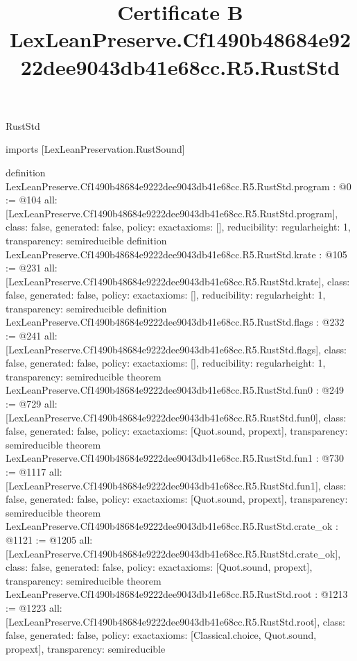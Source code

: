 \begin{lexlean}{RustStd}
\title{Certificate B LexLeanPreserve.Cf1490b48684e9222dee9043db41e68cc.R5.RustStd}
\begin{coremodule}
imports [LexLeanPreservation.RustSound]

definition LexLeanPreserve.Cf1490b48684e9222dee9043db41e68cc.R5.RustStd.program : @0 := @104 {
  all: [LexLeanPreserve.Cf1490b48684e9222dee9043db41e68cc.R5.RustStd.program],
  class: false,
  generated: false,
  policy: exact{axioms: []},
  reducibility: regular{height: 1},
  transparency: semireducible
}
definition LexLeanPreserve.Cf1490b48684e9222dee9043db41e68cc.R5.RustStd.krate : @105 := @231 {
  all: [LexLeanPreserve.Cf1490b48684e9222dee9043db41e68cc.R5.RustStd.krate],
  class: false,
  generated: false,
  policy: exact{axioms: []},
  reducibility: regular{height: 1},
  transparency: semireducible
}
definition LexLeanPreserve.Cf1490b48684e9222dee9043db41e68cc.R5.RustStd.flags : @232 := @241 {
  all: [LexLeanPreserve.Cf1490b48684e9222dee9043db41e68cc.R5.RustStd.flags],
  class: false,
  generated: false,
  policy: exact{axioms: []},
  reducibility: regular{height: 1},
  transparency: semireducible
}
theorem LexLeanPreserve.Cf1490b48684e9222dee9043db41e68cc.R5.RustStd.fun0 : @249 := @729 {
  all: [LexLeanPreserve.Cf1490b48684e9222dee9043db41e68cc.R5.RustStd.fun0],
  class: false,
  generated: false,
  policy: exact{axioms: [Quot.sound, propext]},
  transparency: semireducible
}
theorem LexLeanPreserve.Cf1490b48684e9222dee9043db41e68cc.R5.RustStd.fun1 : @730 := @1117 {
  all: [LexLeanPreserve.Cf1490b48684e9222dee9043db41e68cc.R5.RustStd.fun1],
  class: false,
  generated: false,
  policy: exact{axioms: [Quot.sound, propext]},
  transparency: semireducible
}
theorem LexLeanPreserve.Cf1490b48684e9222dee9043db41e68cc.R5.RustStd.crate_ok : @1121 := @1205 {
  all: [LexLeanPreserve.Cf1490b48684e9222dee9043db41e68cc.R5.RustStd.crate_ok],
  class: false,
  generated: false,
  policy: exact{axioms: [Quot.sound, propext]},
  transparency: semireducible
}
theorem LexLeanPreserve.Cf1490b48684e9222dee9043db41e68cc.R5.RustStd.root : @1213 := @1223 {
  all: [LexLeanPreserve.Cf1490b48684e9222dee9043db41e68cc.R5.RustStd.root],
  class: false,
  generated: false,
  policy: exact{axioms: [Classical.choice, Quot.sound, propext]},
  transparency: semireducible
}


\end{coremodule}
\end{lexlean}

